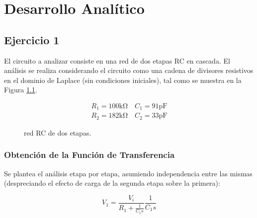 \chapter{Desarrollo Analítico}

\section{Ejercicio 1}

El circuito a analizar consiste en una red de dos etapas RC en cascada. El análisis se realiza considerando el circuito
como una cadena de divisores resistivos en el dominio de Laplace (sin condiciones iniciales), tal como se muestra en la
Figura \ref{crkt:ej1_esquematico}.

\begin{figure}[!ht]
    \centering
    \begin{subfigure}[c]{0.45\textwidth}
        \centering
        
    \end{subfigure}
    \hfill
    \begin{subfigure}[c]{0.45\textwidth}
        \begin{gather*}
            R_1 = 100 \si{\kilo\ohm} \quad C_1 = 91 \si{\pico\farad} \\
            R_2 = 182 \si{\kilo\ohm} \quad C_2 = 33 \si{\pico\farad}
        \end{gather*}
    \end{subfigure}
    \caption{red RC de dos etapas.}
    \label{crkt:ej1_esquematico}
\end{figure}


\subsection{Obtención de la Función de Transferencia}

Se plantea el análisis etapa por etapa, asumiendo independencia entre las mismas (despreciando el efecto de carga de la
segunda etapa sobre la primera):

\begin{equation}
    V_1 = \frac{V_i}{R_1 + \frac{1}{C_1 s}} \frac{1}{C_1 s}
\end{equation}

